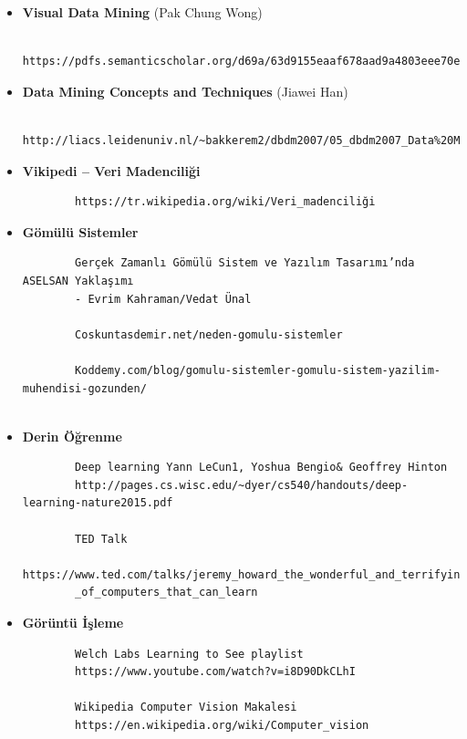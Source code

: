 \documentclass[12pt,a4paper]{report}
\begin{document}
\begin{itemize}
	\item {\bfseries Visual Data Mining} (Pak Chung Wong) 
	
		{\footnotesize \begin{verbatim}
		https://pdfs.semanticscholar.org/d69a/63d9155eaaf678aad9a4803eee70e633a5e7.pdf
		\end{verbatim}}
	
	\item {\bfseries Data Mining Concepts and Techniques} (Jiawei Han)
	
		{\footnotesize \begin{verbatim}
		http://liacs.leidenuniv.nl/~bakkerem2/dbdm2007/05_dbdm2007_Data%20Mining.pdf
		\end{verbatim}}
	
	\item {\bfseries Vikipedi – Veri Madenciliği}
	
		{\footnotesize \begin{verbatim}
		https://tr.wikipedia.org/wiki/Veri_madenciliği
		\end{verbatim}}
	
	\item {\bfseries Gömülü Sistemler}
	
		{\footnotesize \begin{verbatim}
		Gerçek Zamanlı Gömülü Sistem ve Yazılım Tasarımı’nda ASELSAN Yaklaşımı 
		- Evrim Kahraman/Vedat Ünal
		
		Coskuntasdemir.net/neden-gomulu-sistemler
		
		Koddemy.com/blog/gomulu-sistemler-gomulu-sistem-yazilim-muhendisi-gozunden/
		
		\end{verbatim}}
	
	\item {\bfseries Derin Öğrenme}
	
		{\footnotesize \begin{verbatim}
		Deep learning Yann LeCun1, Yoshua Bengio& Geoffrey Hinton
		http://pages.cs.wisc.edu/~dyer/cs540/handouts/deep-learning-nature2015.pdf
		
		TED Talk
		https://www.ted.com/talks/jeremy_howard_the_wonderful_and_terrifying_implications
		_of_computers_that_can_learn
		\end{verbatim}}
	
	\item {\bfseries Görüntü İşleme}
	
		{\footnotesize \begin{verbatim}
		Welch Labs Learning to See playlist
		https://www.youtube.com/watch?v=i8D90DkCLhI
		
		Wikipedia Computer Vision Makalesi
		https://en.wikipedia.org/wiki/Computer_vision
		\end{verbatim}}
	
\end{itemize}
\end{document}
